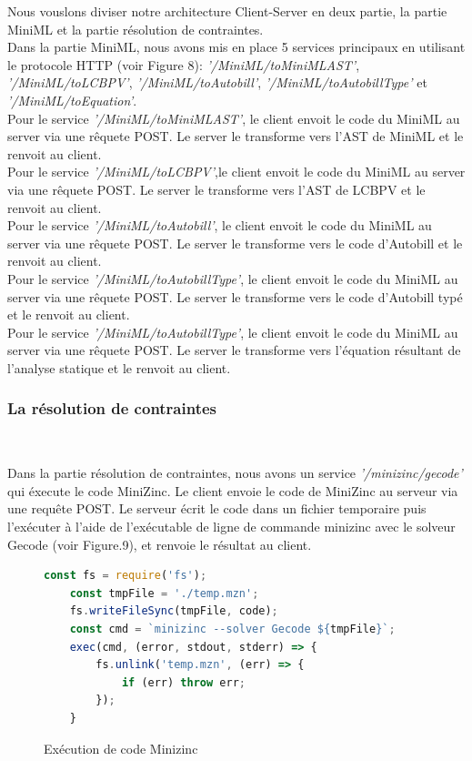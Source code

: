 \documentclass[12pt]{article}
\begin{document}
\newpage

Nous vouslons diviser notre architecture Client-Server en deux partie, la partie MiniML et la partie résolution de contraintes. \\
Dans la partie MiniML, nous avons mis en place 5 services principaux en utilisant le protocole HTTP (voir Figure 8): \emph{'/MiniML/toMiniMLAST'}, \emph{'/MiniML/toLCBPV'}, \emph{'/MiniML/toAutobill'}, \emph{'/MiniML/toAutobillType'} et \emph{'/MiniML/toEquation'}. \\
Pour le service \emph{'/MiniML/toMiniMLAST'}, le client envoit le code du MiniML au server via une rêquete POST. Le server le transforme vers l'AST de MiniML et le renvoit au client.\\
Pour le service \emph{'/MiniML/toLCBPV'},le client envoit le code du MiniML au server via une rêquete POST. Le server le transforme vers l'AST de LCBPV et le renvoit au client.\\
Pour le service \emph{'/MiniML/toAutobill'}, le client envoit le code du MiniML au server via une rêquete POST. Le server le transforme vers le code d'Autobill et le renvoit au client.\\
Pour le service \emph{'/MiniML/toAutobillType'}, le client envoit le code du MiniML au server via une rêquete POST. Le server le transforme vers le code d'Autobill typé et le renvoit au client.\\
Pour le service \emph{'/MiniML/toAutobillType'}, le client envoit le code du MiniML au server via une rêquete POST. Le server le transforme vers l'équation résultant de l'analyse statique et le renvoit au client.\\


\subsubsection{La résolution de contraintes}\

Dans la partie résolution de contraintes, nous avons un service \emph{'/minizinc/gecode'} qui éxecute le code MiniZinc. Le client envoie le code de MiniZinc au serveur via une requête POST. Le serveur écrit le code dans un fichier temporaire puis l'exécuter à l'aide de l'exécutable de ligne de commande minizinc avec le solveur Gecode (voir Figure.9), et renvoie le résultat au client.

\begin{figure}[!b]
      \centering
      \begin{lstlisting}[language=javascript]
    const fs = require('fs');
    const tmpFile = './temp.mzn';
    fs.writeFileSync(tmpFile, code);
    const cmd = `minizinc --solver Gecode ${tmpFile}`;
    exec(cmd, (error, stdout, stderr) => {
        fs.unlink('temp.mzn', (err) => {
            if (err) throw err;
        });
    }
\end{lstlisting}
      \caption{Exécution de code Minizinc}
\end{figure}
\end{document}
